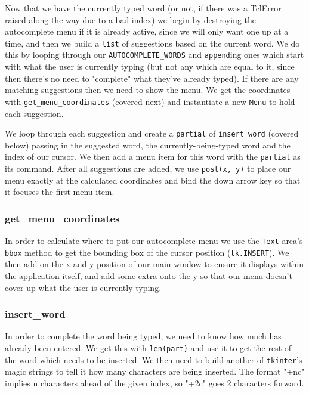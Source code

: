 \documentclass[a4paper,11pt,openany]{book}
\begin{document}
\vspace{5mm}

Now that we have the currently typed word (or not, if there was a TclError raised along the way due to a bad index) we begin by destroying the autocomplete menu if it is already active, since we will only want one up at a time, and then we build a \lstinline[columns=fixed]{list} of suggestions based on the current word. We do this by looping through our \lstinline[columns=fixed]{AUTOCOMPLETE_WORDS} and \lstinline[columns=fixed]{append}ing ones which start with what the user is currently typing (but not any which are equal to it, since then there's no need to "complete" what they've already typed). If there are any matching suggestions then we need to show the menu. We get the coordinates with \lstinline[columns=fixed]{get_menu_coordinates} (covered next) and instantiate a new \lstinline[columns=fixed]{Menu} to hold each suggestion.

\vspace{5mm}

We loop through each suggestion and create a \lstinline[columns=fixed]{partial} of \lstinline[columns=fixed]{insert_word} (covered below) passing in the suggested word, the currently-being-typed word and the index of our cursor. We then add a menu item for this word with the \lstinline[columns=fixed]{partial} as its command. After all suggestions are added, we use \lstinline[columns=fixed]{post(x, y)} to place our menu exactly at the calculated coordinates and bind the down arrow key so that it focuses the first menu item.

\subsubsection{get\_menu\_coordinates}
In order to calculate where to put our autocomplete menu we use the \lstinline[columns=fixed]{Text} area's \lstinline[columns=fixed]{bbox} method to get the bounding box of the cursor position (\lstinline[columns=fixed]{tk.INSERT}). We then add on the x and y position of our main window to ensure it displays within the application itself, and add some extra onto the y so that our menu doesn't cover up what the user is currently typing.  

\subsubsection{insert\_word}
In order to complete the word being typed, we need to know how much has already been entered. We get this with \lstinline[columns=fixed]{len(part)} and use it to get the rest of the word which needs to be inserted. We then need to build another of \lstinline[columns=fixed]{tkinter}'s magic strings to tell it how many characters are being inserted. The format "+nc" implies n characters ahead of the given index, so "+2c" goes 2 characters forward.
\end{document}

